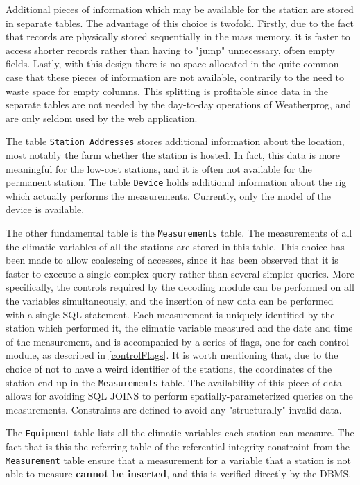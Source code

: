 \documentclass[authoryear,preprint,review,12pt]{elsarticle}
\begin{document}
Additional pieces of information which may be available for the station are stored in separate tables. The advantage of this choice is twofold. Firstly, due to the fact that records are physically stored sequentially in the mass memory,  it is faster to access shorter records rather than having to "jump" unnecessary, often empty fields. Lastly, with this design there is no space allocated in the quite common case that these pieces of information are not available, contrarily to the need to waste space for empty columns. This splitting is profitable since data in the separate tables are not needed by the day-to-day operations of Weatherprog, and are only seldom used by the web application.

The table \texttt{Station Addresses} stores additional information about the location, most notably the farm whether the station is hosted. In fact, this data is more meaningful for the low-cost stations, and it is often not available for the permanent station. The table \texttt{Device} holds additional information about the rig which actually performs the measurements. Currently, only the model of the device is available.

The other fundamental table is the \texttt{Measurements} table. The measurements of all the climatic variables of all the stations are stored in this table. This choice has been made to allow coalescing of accesses, since it has been observed that it is faster to execute a single complex query rather than several simpler queries. More specifically, the controls required by the decoding module can be performed on all the variables simultaneously, and the insertion of new data can be performed with a single SQL statement. Each measurement is uniquely identified by the station which performed it, the climatic variable measured and the date and time of the measurement, and is accompanied by a series of flags, one for each control module, as described in \cref{controlFlags}. It is worth mentioning that, due to the choice of not to have a weird identifier of the stations, the coordinates of the station end up in the \texttt{Measurements} table. The availability of this piece of data allows for avoiding SQL JOINS to perform spatially-parameterized queries on the measurements. Constraints are defined to avoid any "structurally" invalid data.

The \texttt{Equipment} table lists all the climatic variables each station can measure. The fact that is this the referring table of the referential integrity constraint from the \texttt{Measurement} table ensure that a measurement for a variable that a station is not able to measure \textbf{cannot be inserted}, and this is verified directly by the DBMS.
\end{document}

